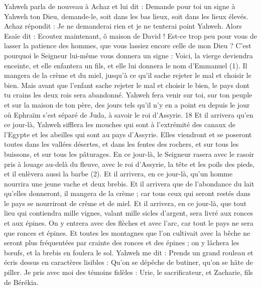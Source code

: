 \begin{multicols}{2}
\TextTitle{[Emmanuel]}
Yahweh parla de nouveau à Achaz et lui dit :
Demande pour toi un signe à Yahweh ton Dieu, demande-le, soit dans les bas lieux, soit dans les lieux élevés.
Achaz répondit : Je ne demanderai rien et je ne tenterai point Yahweh.
Alors Esaïe dit : Ecoutez maintenant, ô maison de David ! Est-ce trop peu pour vous de lasser la patience des hommes, que vous lassiez encore celle de mon Dieu ?
C'est pourquoi le Seigneur lui-même vous donnera un signe : Voici, la vierge deviendra enceinte, et elle enfantera un fils, et elle lui donnera le nom d’Emmanuel (1).
Il mangera de la crème et du miel, jusqu’à ce qu'il sache rejeter le mal et choisir le bien.
Mais avant que l'enfant sache rejeter le mal et choisir le bien, le pays dont tu crains les deux rois sera abandonné.
Yahweh fera venir sur toi, sur ton peuple et sur la maison de ton père, des jours tels qu’il n’y en a point eu depuis le jour où Ephraïm s’est séparé de Juda, à savoir le roi d'Assyrie. 18 Et il arrivera qu'en ce jour-là, Yahweh sifflera les mouches qui sont à l’extrémité des canaux de l'Egypte et les abeilles qui sont au pays d'Assyrie.
Elles viendront et se poseront toutes dans les vallées désertes, et dans les fentes des rochers, et sur tous les buissons, et sur tous les pâturages.
En ce jour-là, le Seigneur rasera avec le rasoir pris à louage au-delà du fleuve, avec le roi d'Assyrie, la tête et les poils des pieds, et il enlèvera aussi la barbe (2).
Et il arrivera, en ce jour-là, qu'un homme nourrira une jeune vache et deux brebis.
Et il arrivera que de l'abondance du lait qu'elles donneront, il mangera de la crème ; car tous ceux qui seront restés dans le pays se nourriront de crème et de miel.
Et il arrivera, en ce jour-là, que tout lieu qui contiendra mille vignes, valant mille sicles d'argent, sera livré aux ronces et aux épines.
On y entrera avec des flèches et avec l'arc, car tout le pays ne sera que ronces et épines.
Et toutes les montagnes que l’on cultivait avec la bêche ne seront plus fréquentées par crainte des ronces et des épines ; on y lâchera les bœufs, et la brebis en foulera le sol.
\VerseOne{}Yahweh me dit : Prends un grand rouleau et écris dessus en caractères lisibles : Qu’on se dépêche de butiner, qu’on se hâte de piller.
Je pris avec moi des témoins fidèles : Urie, le sacrificateur, et Zacharie, fils de Bérékia.

\end{multicols}
